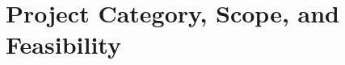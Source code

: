 \documentclass[11pt,a4paper]{report}
\begin{document}

\chapter{Project Category, Scope, and Feasibility}
\end{document}
